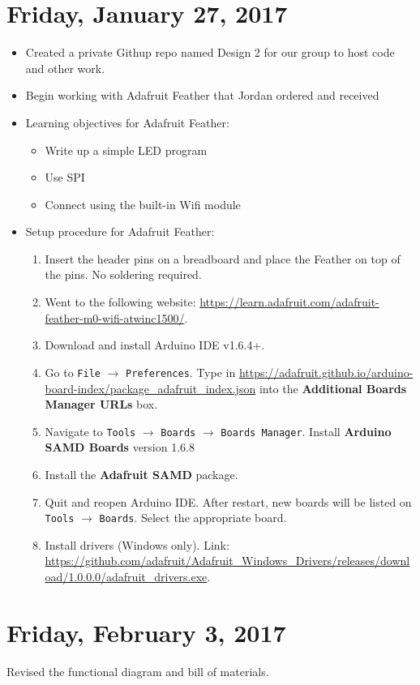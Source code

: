 \documentclass[12pt]{article}
\begin{document}
\section{Friday, January 27, 2017}
\begin{itemize}
\item Created a private Githup repo named Design 2 for our group to host code and other work.
\item Begin working with Adafruit Feather that Jordan ordered and received
\item Learning objectives for Adafruit Feather:
	\begin{itemize}
	\item Write up a simple LED program
	\item Use SPI
	\item Connect using the built-in Wifi module
	\end{itemize}
\item Setup procedure for Adafruit Feather:
	\begin{enumerate}
	\item Insert the header pins on a breadboard and place the Feather on top of the pins. No soldering required.
	\item Went to the following website: \url{https://learn.adafruit.com/adafruit-feather-m0-wifi-atwinc1500/}.
	\item Download and install Arduino IDE v1.6.4+.
	\item Go to \texttt{File} $\rightarrow$ \texttt{Preferences}. Type in \url{https://adafruit.github.io/arduino-board-index/package_adafruit_index.json} into the \textbf{Additional Boards Manager URLs} box.
	\item Navigate to \texttt{Tools} $\rightarrow$ \texttt{Boards} $\rightarrow$ \texttt{Boards Manager}. Install \textbf{Arduino SAMD Boards} version 1.6.8
	\item Install the \textbf{Adafruit SAMD} package.
	\item Quit and reopen Arduino IDE. After restart, new boards will be listed on \texttt{Tools} $\rightarrow$ \texttt{Boards}. Select the appropriate board.
	\item Install drivers (Windows only). Link: \url{https://github.com/adafruit/Adafruit_Windows_Drivers/releases/download/1.0.0.0/adafruit_drivers.exe}.
	\end{enumerate}

\end{itemize}

\section{Friday, February 3, 2017}
Revised the functional diagram and bill of materials.
\end{document}
